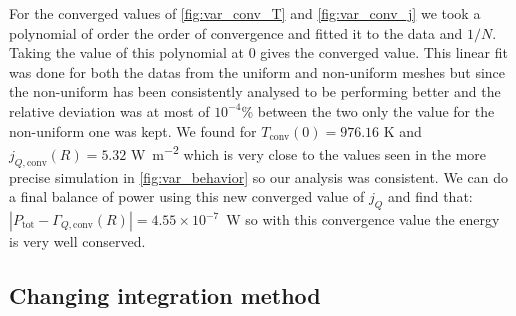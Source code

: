 For the converged values of \autoref{fig:var_conv_T} and \autoref{fig:var_conv_j} we took a polynomial of order the order of convergence and fitted it to the data and $1/N$. Taking the value of this polynomial at $0$ gives the converged value. This linear fit was done for both the datas from the uniform and non-uniform meshes but since the non-uniform has been consistently analysed to be performing better and the relative deviation was at most of $10^{-4}$\% between the two only the value for the non-uniform one was kept. We found for $T_\mathrm{conv}(0) = 976.16$ \si{\kelvin} and $j_{Q,\mathrm{conv}}(R) = 5.32$ \si{\watt\per\meter\squared} which is very close to the values seen in the more precise simulation in \autoref{fig:var_behavior} so our analysis was consistent. We can do a final balance of power using this new converged value of $j_Q$ and find that: \hbox{$|P_\mathrm{tot} - \Gamma_{Q,\mathrm{conv}}(R)| = 4.55 \times 10^{-7}$ \si{\watt}} so with this convergence value the energy is very well conserved.

\subsection{Changing integration method}

